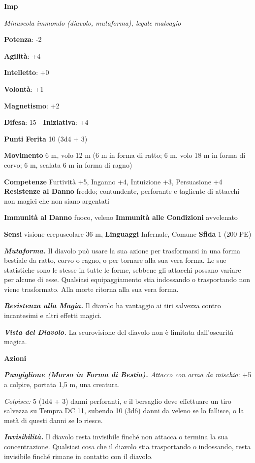 \begin{multicols}{2}
\textbf{Imp}

\emph{Minuscola immondo (diavolo, mutaforma), legale malvagio}

\textbf{Potenza}: -2

\textbf{Agilità}: +4

\textbf{Intelletto}: +0

\textbf{Volontà}: +1

\textbf{Magnetismo}: +2

\textbf{Difesa}: 15 - \textbf{Iniziativa}: +4

\textbf{Punti Ferita} 10 (3d4 + 3)

\textbf{Movimento} 6 m, volo 12 m (6 m in forma di ratto; 6 m, volo 18 m
in forma di corvo; 6 m, scalata 6 m in forma di ragno)

\textbf{Competenze} Furtività +5, Inganno +4, Intuizione +3, Persuasione +4
\textbf{Resistenze al Danno} freddo; contundente, perforante e tagliente
di attacchi non magici che non siano argentati

\textbf{Immunità al Danno} fuoco, veleno \textbf{Immunità alle
Condizioni} avvelenato

\textbf{Sensi} visione crepuscolare 36 m, 
\textbf{Linguaggi} Infernale, Comune \textbf{Sfida} 1 (200 PE)

\emph{\textbf{Mutaforma.}} Il diavolo può usare la sua azione per
trasformarsi in una forma bestiale da ratto, corvo o ragno, o per
tornare alla sua vera forma. Le sue statistiche sono le stesse in tutte
le forme, sebbene gli attacchi possano variare per alcune di esse.
Qualsiasi equipaggiamento stia indossando o trasportando non viene
trasformato. Alla morte ritorna alla sua vera forma.

\emph{\textbf{Resistenza alla Magia.}} Il diavolo ha vantaggio ai tiri
salvezza contro incantesimi e altri effetti magici.

\emph{\textbf{Vista del Diavolo.}} La scurovisione del diavolo non è
limitata dall'oscurità magica.

\textbf{Azioni}

\emph{\textbf{Pungiglione (Morso in Forma di Bestia).} Attacco con arma
da mischia}: +5 a colpire, portata 1,5 m, una creatura.

\emph{Colpisce:} 5 (1d4 + 3) danni perforanti, e il bersaglio deve
effettuare un tiro salvezza su Tempra DC 11, subendo 10 (3d6)
danni da veleno se lo fallisce, o la metà di questi danni se lo riesce.

\emph{\textbf{Invisibilità.}} Il diavolo resta invisibile finché non
attacca o termina la sua concentrazione. Qualsiasi cosa che il diavolo
stia trasportando o indossando, resta invisibile finché rimane in
contatto con il diavolo.


\end{multicols}
